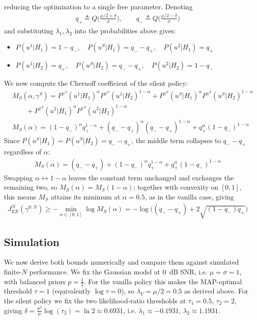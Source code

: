 \documentclass[11pt]{article}
\newcommand{\JNEE}{J^N_{EE}(\gamma^{0:N})}
\begin{document}
reducing the optimization to a single free parameter. Denoting
\begin{align*}
    q_+ \triangleq Q\Big(\frac{\mu/2+\delta}{\sigma}\Big), \qquad q_- \triangleq Q\Big(\frac{\mu/2-\delta}{\sigma}\Big)
\end{align*}
and substituting $\lambda_1,\lambda_2$ into the probabilities above gives:
\begin{itemize}
    \item $P(u^1|H_1) = 1-q_-, \quad P(u^S|H_1) = q_- - q_+, \quad P(u^2|H_1) = q_+$
    \item $P(u^1|H_2) = q_+, \quad P(u^S|H_2) = q_- - q_+, \quad P(u^2|H_2) = 1-q_-$
\end{itemize}
We now compute the Chernoff coefficient of the silent policy:
\begin{align}
    &M_{S}(\alpha,\gamma^S) = P^{\gamma^S}(u^1|H_1)^\alpha P^{\gamma^S}(u^1|H_2)^{1-\alpha} + P^{\gamma^S}(u^S|H_1)^\alpha P^{\gamma^S}(u^S|H_2)^{1-\alpha}\\
    &\qquad + P^{\gamma^S}(u^2|H_1)^\alpha P^{\gamma^S}(u^2|H_2)^{1-\alpha}\\
    &M_{S}(\alpha) = (1-q_-)^{\alpha}q_+^{1-\alpha} + (q_--q_+)^{\alpha}(q_--q_+)^{1-\alpha} + q_+^{\alpha}(1-q_-)^{1-\alpha}
\end{align}
Since $P(u^S|H_1) = P(u^S|H_2) = q_--q_+$, the middle term collapses to $q_--q_+$ regardless of $\alpha$:
\begin{align}
    M_{S}(\alpha) = (q_--q_+) + (1-q_-)^{\alpha}q_+^{1-\alpha} + q_+^{\alpha}(1-q_-)^{1-\alpha}
\end{align}
Swapping $\alpha \leftrightarrow 1-\alpha$ leaves the constant term unchanged and exchanges the remaining two, so $M_S(\alpha) = M_S(1-\alpha)$; together with convexity on $[0,1]$, this means $M_S$ attains its minimum at $\alpha = 0.5$, as in the vanilla case, giving
\begin{align}
    \JNEE \geq -\min_{\alpha\in[0,1]}\log M_{S}(\alpha) = -\log\Big((q_--q_+) + 2\sqrt{(1-q_-)q_+}\Big)
\end{align}

\subsection*{Simulation}
We now derive both bounds numerically and compare them against simulated finite-$N$ performance. \newline
We fix the Gaussian model at $0$~dB SNR, i.e. $\mu = \sigma = 1$, with balanced priors $p = \tfrac12$.\newline 
For the vanilla policy this makes the MAP-optimal threshold $\tau = 1$ (equivalently $\log\tau = 0$), so $\lambda_V = \mu/2 = 0.5$ as derived above.\newline
For the silent policy we fix the two likelihood-ratio thresholds at $\tau_1 = 0.5$, $\tau_2 = 2$, giving $\delta = \frac{\sigma^2}{\mu}\log(\tau_2) = \ln 2 \approx 0.6931$, i.e. $\lambda_1 \approx -0.1931$, $\lambda_2 \approx 1.1931$.
\end{document}
